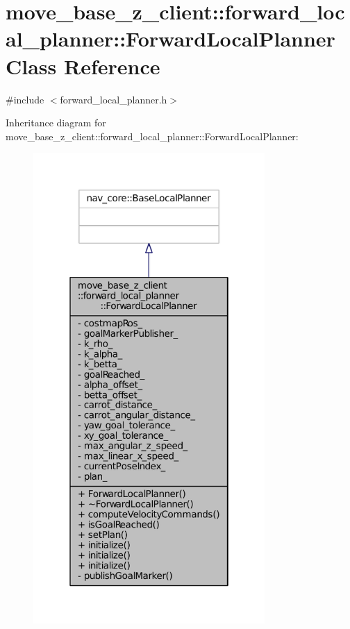 \hypertarget{classmove__base__z__client_1_1forward__local__planner_1_1ForwardLocalPlanner}{}\section{move\+\_\+base\+\_\+z\+\_\+client\+:\+:forward\+\_\+local\+\_\+planner\+:\+:Forward\+Local\+Planner Class Reference}
\label{classmove__base__z__client_1_1forward__local__planner_1_1ForwardLocalPlanner}


{\ttfamily \#include $<$forward\+\_\+local\+\_\+planner.\+h$>$}



Inheritance diagram for move\+\_\+base\+\_\+z\+\_\+client\+:\+:forward\+\_\+local\+\_\+planner\+:\+:Forward\+Local\+Planner\+:
\nopagebreak
\begin{figure}[H]
\begin{center}
\leavevmode
\includegraphics[width=250pt]{classmove__base__z__client_1_1forward__local__planner_1_1ForwardLocalPlanner__inherit__graph}
\end{center}
\end{figure}


